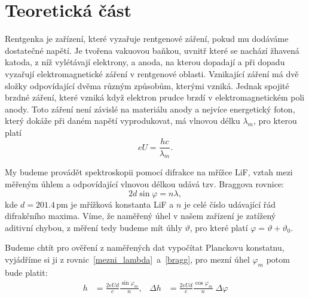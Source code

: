 \documentclass[10pt,a4paper]{article}
\renewcommand{\U}[1]{\ensuremath{\,\mathrm{#1}}}
\newcommand{\°}{\degree}
\begin{document}
\pagebreak

\section{Teoretická část}
Rentgenka je zařízení, které vyzařuje rentgenové záření, pokud mu dodáváme dostatečné napětí. Je tvořena vakuovou baňkou, uvnitř které se nachází žhavená katoda, z níž vylétávají elektrony, a anoda, na kterou dopadají a při dopadu vyzařují elektromagnetické záření v rentgenové oblasti. Vznikající záření má dvě složky odpovídající dvěma různým způsobům, kterými vzniká. Jednak spojité brzdné záření, které vzniká když elektron prudce brzdí v elektromagnetickém poli anody. Toto záření není závislé na materiálu anody a nejvíce energetický foton, který dokáže při daném napětí vyprodukovat, má vlnovou délku $\lambda_m$, pro kterou platí
\begin{equation}
    eU = \frac{hc}{\lambda_m}.
    \label{mezni_lambda}
\end{equation}

My budeme provádět spektroskopii pomocí difrakce na mřížce LiF, vztah mezi měřeným úhlem a odpovídající vlnovou délkou udává tzv. Braggova rovnice:
\begin{equation}
    2d \sin \varphi = n\lambda,
    \label{bragg}
\end{equation}
kde $d=201.4 \U{pm}$ je mřížková konstanta LiF a $n$ je celé číslo udávající řád difrakčního maxima. Víme, že naměřený úhel v našem zařízení je zatížený aditivní chybou, z měření tedy budeme mít úhly $\vartheta$, pro které platí $\varphi = \vartheta + \vartheta_0$.

Budeme chtít pro ověření z naměřených dat vypočítat Planckovu konstatnu, vyjádříme si ji z rovnic~\eqref{mezni_lambda}~a~\eqref{bragg}, pro mezní úhel $\varphi_m$ potom bude platit:
\begin{align}
    h &= \frac{2eUd}{c} \frac{\sin \varphi_m}{n}, &
    \Delta h &= \frac{2eUd}{c} \frac{\cos \varphi_m}{n} \; \Delta\varphi
    \label{planck}
\end{align}
\end{document}
